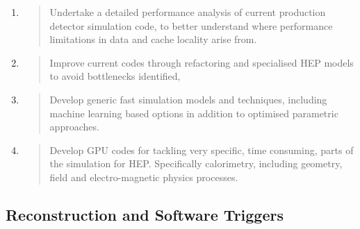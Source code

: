 \documentclass[10pt,a4paper]{article}
\begin{document}
\begin{enumerate}
\def\labelenumi{\arabic{enumi}.}
\item
  \begin{quote}
  Undertake a detailed performance analysis of current production
  detector simulation code, to better understand where performance
  limitations in data and cache locality arise from.
  \end{quote}
\item
  \begin{quote}
  Improve current codes through refactoring and specialised HEP models
  to avoid bottlenecks identified,
  \end{quote}
\item
  \begin{quote}
  Develop generic fast simulation models and techniques, including
  machine learning based options in addition to optimised parametric
  approaches.
  \end{quote}
\item
  \begin{quote}
  Develop GPU codes for tackling very specific, time consuming, parts of
  the simulation for HEP. Specifically calorimetry, including geometry,
  field and electro-magnetic physics processes.
  \end{quote}
\end{enumerate}

\hypertarget{reconstruction-and-software-triggers-1}{%
\subsection{Reconstruction and Software
Triggers}\label{reconstruction-and-software-triggers-1}}
\end{document}
